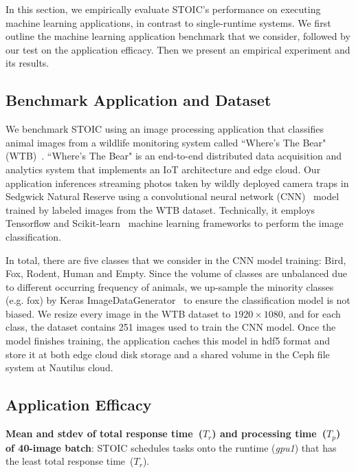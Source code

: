 In this section, we empirically evaluate STOIC's performance on executing machine learning applications, in contrast to single-runtime systems. We first outline the machine learning application benchmark that we consider, followed by our test on the application efficacy. Then we present an empirical experiment and its results.

\subsection{Benchmark Application and Dataset}

We benchmark STOIC using an image processing application that classifies animal images from a wildlife monitoring system called ``Where's The Bear" (WTB)~\cite{ref:wtb}. ``Where's The Bear" is an end-to-end distributed data acquisition and analytics system that implements an IoT architecture and edge cloud. Our application inferences streaming photos taken by wildly deployed camera traps in Sedgwick Natural Reserve using a convolutional neural network (CNN)~\cite{ref:cnn} model trained by labeled images from the WTB dataset. Technically, it employs Tensorflow and Scikit-learn~\cite{ref:scikit} machine learning frameworks to perform the image classification.  

 In total, there are five classes that we consider in the CNN model training: Bird, Fox, Rodent, Human and Empty. Since the volume of classes are unbalanced due to different occurring frequency of animals, we up-sample the minority classes (e.g. fox) by Keras ImageDataGenerator~\cite{ref:keras} to ensure the classification model is not biased. We resize every image in the WTB dataset to $1920 \times 1080$, and for each class, the dataset contains 251 images used to train the CNN model. Once the model finishes training, the application caches this model in hdf5 format and store it at both edge cloud disk storage and a shared volume in the Ceph file system at Nautilus cloud. 

\subsection{Application Efficacy}

\begin{table}[t] \centering 

\caption{\textbf{Mean and stdev of total response time~($T_r$) and processing time~($T_p$) of 40-image batch}: STOIC schedules tasks onto the runtime (\textit{gpu1}) that has the least total response time~($T_r$).
\label{tab:validation}}
\end{table}

